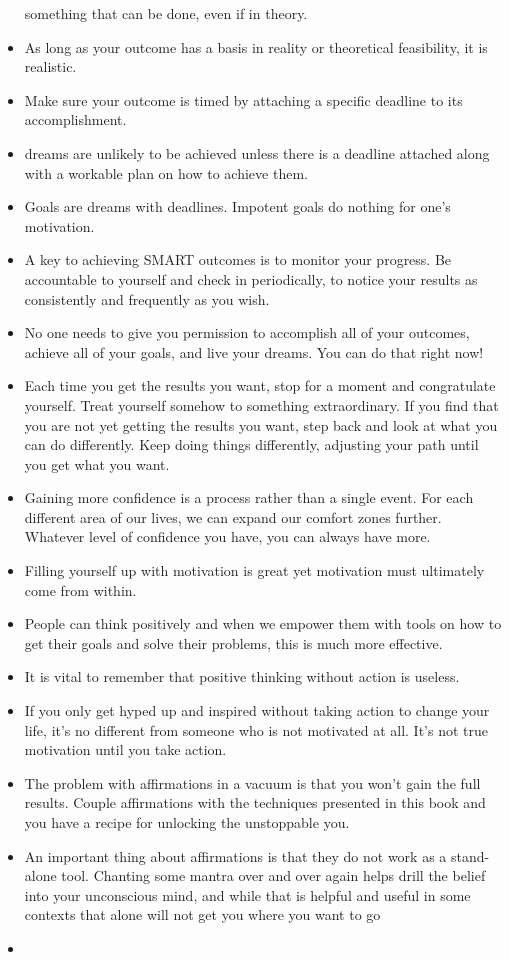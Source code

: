 \begin{itemize}
        something that can be done, even if in theory.
        \item As long as your outcome has a basis in reality or
        theoretical feasibility, it is realistic.
        \item Make sure your outcome is timed by attaching a specific deadline to its accomplishment.
        \item dreams are unlikely to
        be achieved unless there is a deadline attached along with a workable plan on how to achieve them.
        \item Goals are dreams with deadlines. Impotent goals do nothing for one’s motivation.
        \item A key to achieving SMART outcomes is to monitor your progress. Be accountable to yourself and
        check in periodically, to notice your results as consistently and frequently as you wish.
        \item No one
        needs to give you permission to accomplish all of your outcomes, achieve all of your goals, and live
        your dreams. You can do that right now!
        \item Each time you get the results you want, stop for a moment
        and congratulate yourself. Treat yourself somehow to something extraordinary. If you find that you
        are not yet getting the results you want, step back and look at what you can do differently. Keep
        doing things differently, adjusting your path until you get what you want.
        \item Gaining more confidence is a process rather than a single event. For each different area of our lives,
        we can expand our comfort zones further. Whatever level of confidence you have, you can always
        have more.
        \item Filling yourself up with motivation is great yet motivation
        must ultimately come from within.
        \item People can think positively and when we empower them with tools on
        how to get their goals and solve their problems, this is much more effective.
        \item It is vital to remember that positive thinking without action is useless.
        \item If you only get hyped up and inspired without taking action to change your life, it’s
        no different from someone who is not motivated at all. It’s not true motivation until
        you take action.
        \item The problem with affirmations in a vacuum is that you won’t
        gain the full results. Couple affirmations with the techniques presented in this book and you have a
        recipe for unlocking the unstoppable you.
        \item An important
        thing about affirmations is that they do not work as a stand-alone tool. Chanting some mantra over
        and over again helps drill the belief into your unconscious mind, and while that is helpful and useful
        in some contexts that alone will not get you where you want to go
        \item 
    \end{itemize}
